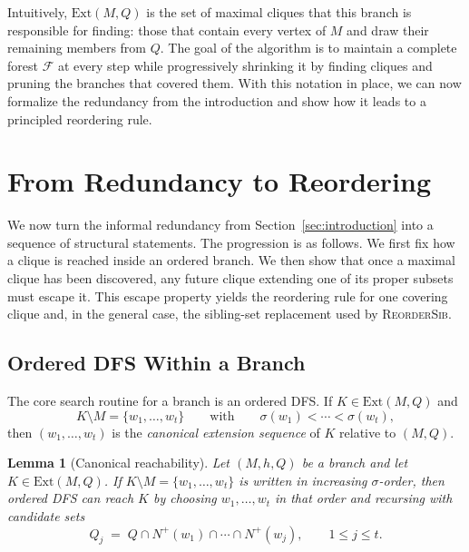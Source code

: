 \documentclass[sigconf, nonacm]{acmart}
\newtheorem{lemma}[theorem]{Lemma}
\theoremstyle{definition}
\theoremstyle{remark}
\begin{document}
Intuitively, $\mathrm{Ext}(M, Q)$ is the set of maximal cliques that this
branch is responsible for finding: those that contain every vertex of $M$ and
draw their remaining members from $Q$.  The goal of the algorithm is to maintain
a complete forest $\mathcal{F}$ at every step while progressively shrinking it
by finding cliques and pruning the branches that covered them.  With this
notation in place, we can now formalize the redundancy from the introduction
and show how it leads to a principled reordering rule.

\section{From Redundancy to Reordering}
\label{sec:dfs}

We now turn the informal redundancy from Section~\ref{sec:introduction} into a
sequence of structural statements.  The progression is as follows.  We first
fix how a clique is reached inside an ordered branch.  We then show that once a
maximal clique has been discovered, any future clique extending one of its
proper subsets must escape it.  This escape property yields the reordering rule
for one covering clique and, in the general case, the sibling-set replacement
used by \textsc{ReorderSib}.

\subsection{Ordered DFS Within a Branch}

The core search routine for a branch is an ordered DFS.  If
$K \in \mathrm{Ext}(M,Q)$ and
\[
  K \setminus M = \{w_1,\ldots,w_t\}
  \qquad\text{with}\qquad
  \sigma(w_1) < \cdots < \sigma(w_t),
\]
then $(w_1,\ldots,w_t)$ is the \emph{canonical extension sequence} of $K$
relative to $(M,Q)$.

\begin{lemma}[Canonical reachability]\label{lem:canonical}
Let $(M,h,Q)$ be a branch and let $K \in \mathrm{Ext}(M,Q)$.  If
$K \setminus M = \{w_1,\ldots,w_t\}$ is written in increasing $\sigma$-order,
then ordered DFS can reach $K$ by choosing $w_1,\ldots,w_t$ in that order and
recursing with candidate sets
\[
  Q_j
  \;=\;
  Q \cap N^+(w_1) \cap \cdots \cap N^+(w_j),
  \qquad 1 \le j \le t.
\]
\end{lemma}
\end{document}
